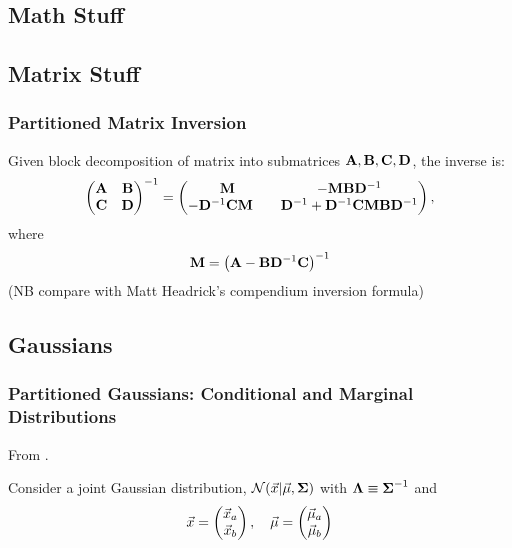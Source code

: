 \documentclass[11pt]{article}
\begin{document}
\newpage
\begin{appendices}
  \section{Math Stuff}

  \subsection{Matrix Stuff}
  \subsubsection{Partitioned Matrix Inversion}
  Given block decomposition of matrix into submatrices
  $\mathbf{A}, \mathbf{B}, \mathbf{C}, \mathbf{D}$, the inverse is:
  \begin{equation}
    \left(
      \begin{matrix}
        \mathbf{A} & \mathbf{B} \\
        \mathbf{C} & \mathbf{D}
      \end{matrix}
    \right)^{-1}
    =
    \left(
      \begin{matrix}
        \mathbf{M}                     & - \mathbf{M} \mathbf{B} \mathbf{D}^{-1} \\
        -\mathbf{D}^{-1} \mathbf{C} \mathbf{M} \quad & \mathbf{D}^{-1} + \mathbf{D}^{-1} \mathbf{C} \mathbf{M} \mathbf{B} \mathbf{D}^{-1}
      \end{matrix}
    \right),
  \end{equation}
  where
  \begin{equation}
    \mathbf{M} = \left(\mathbf{A} - \mathbf{B} \mathbf{D}^{-1} \mathbf{C} \right)^{-1}
  \end{equation}
  (NB compare with Matt Headrick's compendium inversion formula)


\subsection{Gaussians}
\subsubsection{Partitioned Gaussians: Conditional and Marginal Distributions}
From \cite[sections 2.3.1 - 2.3.2]{BISHOP}.

Consider a joint Gaussian distribution, $\mathcal{N}(\vec{x} | \vec{\mu}, \boldsymbol{\Sigma})$ with
$\boldsymbol{\Lambda} \equiv \boldsymbol{\Sigma}^{-1}$ and
\begin{equation}
  \vec{x} =
  \left(
    \begin{matrix}
      \vec{x}_a \\
      \vec{x}_b
    \end{matrix}
  \right)
  , \quad
  \vec{\mu} =
  \left(
    \begin{matrix}
      \vec{\mu}_a \\
      \vec{\mu}_b
    \end{matrix}
  \right)
\end{equation}


\end{appendices}
\end{document}
